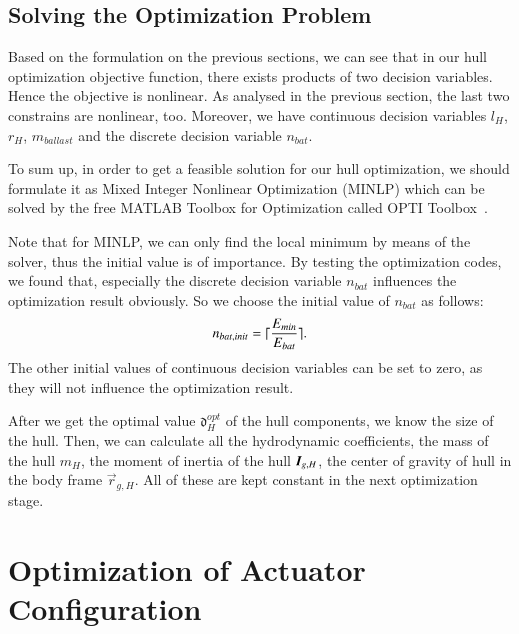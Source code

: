 \subsection{Solving the Optimization Problem}
Based on the formulation on the previous sections, we can see that in our hull optimization objective function, there exists products of two decision variables. Hence the objective is nonlinear. As analysed in the previous section, the last two constrains are nonlinear, too. Moreover, we have continuous decision variables $l_{H}$, $r_{H}$, $m_{ballast}$ and the discrete decision variable $n_{bat}$. 

To sum up, in order to get a feasible solution for our hull optimization, we should formulate it as Mixed Integer Nonlinear Optimization (MINLP) which can be solved by the free MATLAB Toolbox for Optimization called OPTI  Toolbox~\cite{CW12a}.

Note that for MINLP, we can only find the local minimum by means of the solver, thus the initial value is of importance. By testing the optimization codes, we found that, especially the discrete decision variable $n_{bat}$ influences the optimization result obviously. So we choose the initial value of $n_{bat}$ as follows:
\begin{align}
n_{bat,init}=\lceil\dfrac{E_{min}}{E_{bat}}\rceil.
\end{align}  
The other initial values of continuous decision variables can be set to zero, as they will not influence the optimization result. 

After we get the optimal value $\mathfrak{d}_{H}^{opt}$ of the hull components, we know the size of the hull. Then, we can calculate all the hydrodynamic coefficients, the mass of the hull $m_{H}$, the moment of inertia of the hull $\emph{\textbf{I}}_{g,H}$, the center of gravity of hull in the body frame $\vec{r}_{g,H}$. All of these are kept constant in the next optimization stage.
\section{Optimization of Actuator Configuration}

